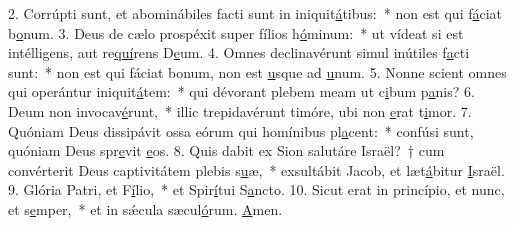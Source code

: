 2. Corrúpti sunt, et abominábiles facti sunt in iniquit\uline{á}tibus:~* non est qui f\uline{á}ciat b\uline{o}num.
3. Deus de cælo prospéxit super fílios h\uline{ó}minum:~* ut vídeat si est intélligens, aut re\uline{quí}rens D\uline{e}um.
4. Omnes declinavérunt simul inútiles f\uline{a}cti sunt:~* non est qui fáciat bonum, non est \uline{u}sque ad \uline{u}num.
5. Nonne scient omnes qui operántur iniquit\uline{á}tem:~* qui dévorant plebem meam ut c\uline{i}bum p\uline{a}nis?
6. Deum non invocav\uline{é}runt,~* illic trepidavérunt timóre, ubi non \uline{e}rat t\uline{i}mor.
7. Quóniam Deus dissipávit ossa eórum qui homínibus pl\uline{a}cent:~* confúsi sunt, quóniam Deus spr\uline{e}vit \uline{e}os.
8. Quis dabit ex Sion salutáre Israël?~† cum convérterit Deus captivitátem plebis s\uline{u}æ,~* exsultábit Jacob, et læt\uline{á}bitur \uline{I}sraël.
9. Glória Patri, et F\uline{í}lio,~* et Spir\uline{í}tui S\uline{a}ncto.
10. Sicut erat in princípio, et nunc, et s\uline{e}mper,~* et in sǽcula sæcul\uline{ó}rum. \uline{A}men.
